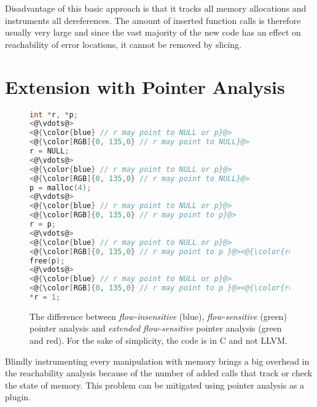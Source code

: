 Disadvantage of this basic approach is that it tracks all memory allocations and
instruments all dereferences. The amount of inserted function calls is
therefore usually very large and since the vast majority of the new code has
an effect on reachability of error locations, it cannot be removed by slicing.

\section{Extension with Pointer Analysis}\label{sec:pta}

\begin{figure}[t]
\begin{lstlisting}[language=C]
int *r, *p;
<@\vdots@>
<@{\color{blue} // r may point to NULL or p}@>
<@{\color[RGB]{0, 135,0} // r may point to NULL}@>
r = NULL;
<@\vdots@>
<@{\color{blue} // r may point to NULL or p}@>
<@{\color[RGB]{0, 135,0} // r may point to NULL}@>
p = malloc(4);
<@\vdots@>
<@{\color{blue} // r may point to NULL or p}@>
<@{\color[RGB]{0, 135,0} // r may point to p}@>
r = p;
<@\vdots@>
<@{\color{blue} // r may point to NULL or p}@>
<@{\color[RGB]{0, 135,0} // r may point to p }@><@{\color{red} or is invalidated}@>
free(p);
<@\vdots@>
<@{\color{blue} // r may point to NULL or p}@>
<@{\color[RGB]{0, 135,0} // r may point to p }@><@{\color{red} or is invalidated}@>
*r = 1;
\end{lstlisting}
\caption{The difference between \emph{flow-insensitive} (blue), \emph{flow-sensitive} (green) pointer analysis and \emph{extended flow-sensitive} pointer analysis (green and red). For the sake of simplicity, the code is in C and not LLVM.}
\label{fig:example2}
\end{figure}


Blindly instrumenting every manipulation with memory brings a big
overhead in the reachability analysis because of the number of added
calls that track or check the state of memory. This problem can be
mitigated using pointer analysis as a plugin.

